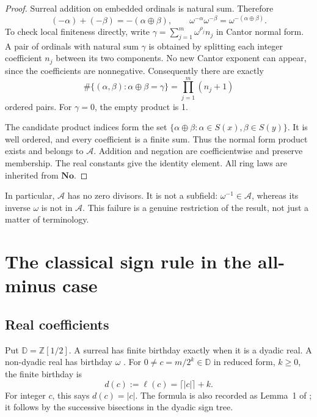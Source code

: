 \documentclass[11pt,letterpaper]{article}
\newtheorem{proposition}[theorem]{Proposition}
\theoremstyle{definition}
\theoremstyle{remark}
\newcommand{\No}{\mathbf{No}}
\newcommand{\Z}{\mathbb{Z}}
\newcommand{\D}{\mathbb{D}}
\newcommand{\A}{\mathscr{A}}
\newcommand{\bd}{\ell}
\newcommand{\ns}{\mathbin{\oplus}}
\begin{document}
\begin{proof}
Surreal addition on embedded ordinals is natural sum. Therefore
\[
 (-\alpha)+(-\beta)=-(\alpha\ns\beta),\qquad
 \omega^{-\alpha}\omega^{-\beta}
       =\omega^{-(\alpha\ns\beta)}.
\]
To check local finiteness directly, write
\(\gamma=\sum_{j=1}^m\omega^{\rho_j}n_j\) in Cantor normal form.
A pair of ordinals with natural sum \(\gamma\) is obtained by splitting
each integer coefficient \(n_j\) between its two components. No new
Cantor exponent can appear, since the coefficients are nonnegative.
Consequently there are exactly
\begin{equation}\label{eq:fiber-count}
 \#\{(\alpha,\beta):\alpha\ns\beta=\gamma\}
     =\prod_{j=1}^m(n_j+1)
\end{equation}
ordered pairs. For \(\gamma=0\), the empty product is 1.

The candidate product indices form the set
\(\{\alpha\ns\beta:\alpha\in S(x),\beta\in S(y)\}\).
It is well ordered, and every coefficient is a finite sum. Thus the normal
form product exists and belongs to \(\A\). Addition and negation are
coefficientwise and preserve membership. The real constants give the
identity element. All ring laws are inherited from \(\No\).
\end{proof}

In particular, \(\A\) has no zero divisors. It is not a subfield:
\(\omega^{-1}\in\A\), whereas its inverse \(\omega\) is not in
\(\A\). This failure is a genuine restriction of the result, not just a
matter of terminology.

\section{The classical sign rule in the all-minus case}

\subsection{Real coefficients}
Put \(\D=\Z[1/2]\). A surreal has finite birthday exactly when it is a
dyadic real. A non-dyadic real has birthday \(\omega\)
\cite[Section~5]{Berarducci}. For \(0\ne c=m/2^k\in\D\) in reduced
form, \(k\geq0\), the finite birthday is
\begin{equation}\label{eq:dyadic-birthday}
 d(c):=\bd(c)=\lceil |c|\rceil+k.
\end{equation}
For integer \(c\), this says \(d(c)=|c|\). The formula is also recorded
as Lemma~1 of \cite{Roughan}; it follows by the successive bisections in
the dyadic sign tree.
\end{document}
